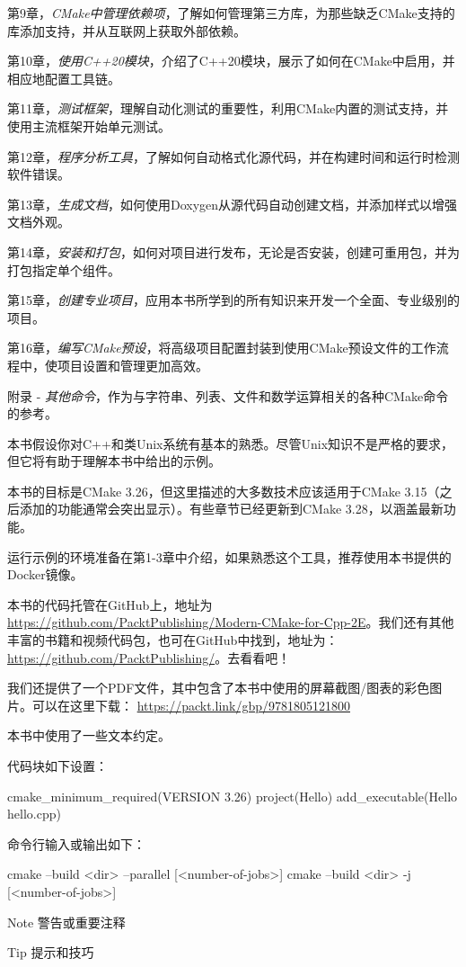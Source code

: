 第9章，\textit{CMake中管理依赖项}，了解如何管理第三方库，为那些缺乏CMake支持的库添加支持，并从互联网上获取外部依赖。

第10章，\textit{使用C++20模块}，介绍了C++20模块，展示了如何在CMake中启用，并相应地配置工具链。

第11章，\textit{测试框架}，理解自动化测试的重要性，利用CMake内置的测试支持，并使用主流框架开始单元测试。

第12章，\textit{程序分析工具}，了解如何自动格式化源代码，并在构建时间和运行时检测软件错误。

第13章，\textit{生成文档}，如何使用Doxygen从源代码自动创建文档，并添加样式以增强文档外观。

第14章，\textit{安装和打包}，如何对项目进行发布，无论是否安装，创建可重用包，并为打包指定单个组件。

第15章，\textit{创建专业项目}，应用本书所学到的所有知识来开发一个全面、专业级别的项目。

第16章，\textit{编写CMake预设}，将高级项目配置封装到使用CMake预设文件的工作流程中，使项目设置和管理更加高效。

附录 - \textit{其他命令}，作为与字符串、列表、文件和数学运算相关的各种CMake命令的参考。


本书假设你对C++和类Unix系统有基本的熟悉。尽管Unix知识不是严格的要求，但它将有助于理解本书中给出的示例。

本书的目标是CMake 3.26，但这里描述的大多数技术应该适用于CMake 3.15（之后添加的功能通常会突出显示）。有些章节已经更新到CMake 3.28，以涵盖最新功能。

运行示例的环境准备在第1-3章中介绍，如果熟悉这个工具，推荐使用本书提供的Docker镜像。


本书的代码托管在GitHub上，地址为\url{https://github.com/PacktPublishing/Modern-CMake-for-Cpp-2E}。我们还有其他丰富的书籍和视频代码包，也可在GitHub中找到，地址为：\url{https://github.com/PacktPublishing/}。去看看吧！


我们还提供了一个PDF文件，其中包含了本书中使用的屏幕截图/图表的彩色图片。可以在这里下载： \url{https://packt.link/gbp/9781805121800}


本书中使用了一些文本约定。

代码块如下设置：

\begin{cmake}
cmake_minimum_required(VERSION 3.26)
project(Hello)
add_executable(Hello hello.cpp)
\end{cmake}

命令行输入或输出如下：

\begin{shell}
cmake --build <dir> --parallel [<number-of-jobs>]
cmake --build <dir> -j [<number-of-jobs>]
\end{shell}

\begin{myNotic}{Note}
警告或重要注释
\end{myNotic}

\begin{myTip}{Tip}
提示和技巧
\end{myTip}






